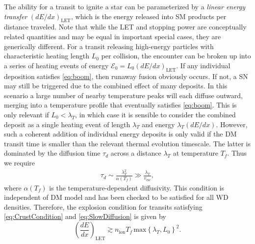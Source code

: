 \documentclass[twocolumn,showpacs,preprintnumbers,amsmath,amssymb,prd]{revtex4}
\begin{document}
The ability for a transit to ignite a star can be parameterized by a \emph{linear energy transfer} $(dE/dx)_\text{LET}$, which is the energy released into SM products per distance traveled. Note that while the LET and stopping power are conceptually related quantities and may be equal in important special cases, they are generically different.  For a transit releasing high-energy particles with characteristic heating length $L_0$ per collision, the encounter can be broken up into a series of heating events of energy $\mathcal{E}_0 = L_0 (d E/d x)_\text{LET}$.  If any individual deposition satisfies \eqref{eq:boom}, then runaway fusion obviously occurs.  If not, a SN may still be triggered due to the combined effect of many deposits. In this scenario a large number of nearby temperature peaks will each diffuse outward, merging into a temperature profile that eventually satisfies \eqref{eq:boom}.  This is only relevant if $L_0 < \lambda_T$, in which case it is sensible to consider the combined deposit as a single heating event of length $\lambda_T$ and energy $\lambda_T (d E/d x)$. However, such a coherent addition of individual energy deposits is only valid if the DM transit time is smaller than the relevant thermal evolution timescale. The latter is dominated by the diffusion time $\tau_d$ across a distance $\lambda_T$ at temperature $T_f$. Thus we require
\begin{align}
\tau_d \sim \frac{\lambda_T^2}{\alpha(T_f)} \gg \frac{\lambda_T}{v_\text{esc}},
\label{eq:SlowDiffusion}
\end{align}
where $\alpha(T_f)$ is the temperature-dependent diffusivity. This condition is independent of DM model and has been checked to be satisfied for all WD densities. Therefore, the explosion condition for transits satisfying \eqref{eq:CrustCondition} and \eqref{eq:SlowDiffusion} is given by
\begin{equation}
\label{eq:transitexplosion}
  \left( \frac{d E}{d x} \right)_\text{LET} \gtrsim n_\text{ion} T_f\, \text{max}\left\{\lambda_T, L_0 \right\}^2.
\end{equation}
\end{document}
